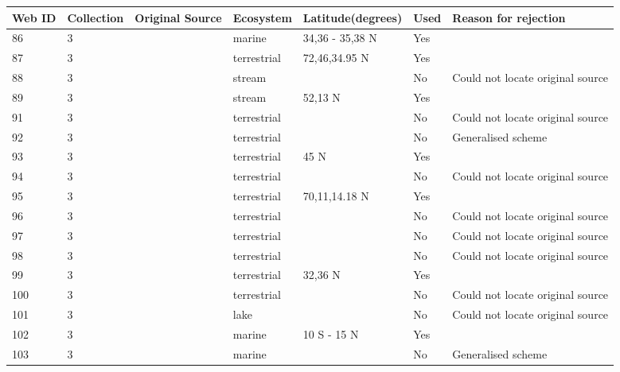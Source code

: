 \documentclass[12pt]{article}
\begin{document}
\begin{landscape}
    \begin{table}[h!]
    \centering
    {\footnotesize
      \begin{tabular}{p{2.8cm}p{1.3cm}p{3cm}p{2.2cm}p{2.5cm}lp{8.2cm}}
        \hline
        Web ID & Collection & Original Source & Ecosystem & Latitude(degrees) & Used  & Reason for rejection  \\
        \hline
        86    & 3 & \cite{Hogetsu1979}  & marine & 34,36 - 35,38 N & Yes   &       \\
        87    & 3 & \cite{Bradstreet1982}  & terrestrial & 72,46,34.95 N & Yes   &       \\
        88    & 3 & \cite{Kuusela1980}  & stream &       & No    & Could not locate original source \\
        89    & 3 & \cite{Hartley1948}  & stream & 52,13 N & Yes   &       \\
        91    & 3 & \cite{Cohen1990}  & terrestrial &       & No    & Could not locate original source \\
        92    & 3 & \cite{Swan1961}  & terrestrial &       & No    & Generalised scheme \\
        93    & 3 & \cite{Pattie1966}    & terrestrial & 45 N  & Yes   &       \\
        94    & 3 & \cite{Brown1971}    & terrestrial &       & No    & Could not locate original source \\
        95    & 3 & \cite{Brown1975}    & terrestrial & 70,11,14.18 N & Yes   &       \\
        96    & 3 & \cite{Cohen1990}  & terrestrial &       & No    & Could not locate original source \\
        97    & 3 & \cite{Cohen1990}  & terrestrial &       & No    & Could not locate original source \\
        98    & 3 & \cite{Holm1980}  & terrestrial &       & No    & Could not locate original source \\
        99    & 3 & \cite{Howes1954}    & terrestrial & 32,36 N & Yes   &       \\
        100   & 3 & \cite{Cohen1990}  & terrestrial &       & No    & Could not locate original source \\
        101   & 3 & \cite{Cohen1990} & lake  &       & No    & Could not locate original source \\
        102   & 3 & \cite{Shushkina1979}  & marine & 10 S - 15 N & Yes   &       \\
        103   & 3 & \cite{Petipa1979}  & marine &       & No    & Generalised scheme \\

\end{tabular}}
\end{table}
\end{landscape}
\end{document}

